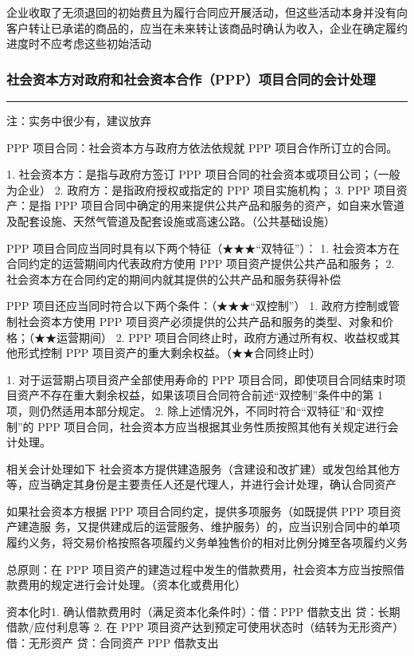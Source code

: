 \documentclass[UTF8,12pt]{ctexart}
\numberwithin{equation}{section} %
\numberwithin{figure}{section}
\numberwithin{table}{section}
\begin{document}
	企业收取了无须退回的初始费且为履行合同应开展活动，但这些活动本身并没有向客户转让已承诺的商品的，应当在未来转让该商品时确认为收入，企业在确定履约进度时不应考虑这些初始活动
	

	\subsubsection{社会资本方对政府和社会资本合作（PPP）项目合同的会计处理}
	\vspace{5pt}
	\hrule
	\vspace{5pt}
	注：实务中很少有，建议放弃
	
	PPP 项目合同：社会资本方与政府方依法依规就 PPP 项目合作所订立的合同。
	
	1.	社会资本方：是指与政府方签订 PPP 项目合同的社会资本或项目公司；（一般为企业）
	2.	政府方：是指政府授权或指定的 PPP 项目实施机构；
	3.	PPP 项目资产：是指 PPP 项目合同中确定的用来提供公共产品和服务的资产，如自来水管道及配套设施、天然气管道及配套设施或高速公路。（公共基础设施）
	
	PPP 项目合同应当同时具有以下两个特征（★★★“双特征”）：
	1.	社会资本方在合同约定的运营期间内代表政府方使用 PPP 项目资产提供公共产品和服务；
	2.	社会资本方在合同约定的期间内就其提供的公共产品和服务获得补偿
	
	PPP 项目还应当同时符合以下两个条件：（★★★“双控制”）
	1.	政府方控制或管制社会资本方使用 PPP 项目资产必须提供的公共产品和服务的类型、对象和价格；（★★运营期间）
	2.	PPP 项目合同终止时，政府方通过所有权、收益权或其他形式控制 PPP 项目资产的重大剩余权益。（★★合同终止时）
	
	1.	对于运营期占项目资产全部使用寿命的 PPP 项目合同，即使项目合同结束时项目资产不存在重大剩余权益，如果该项目合同符合前述“双控制”条件中的第 1 项，则仍然适用本部分规定。
	2.	除上述情况外，不同时符合“双特征”和“双控制”的 PPP 项目合同，社会资本方应当根据其业务性质按照其他有关规定进行会计处理。
	
	相关会计处理如下
	社会资本方提供建造服务（含建设和改扩建）或发包给其他方等，应当确定其身份是主要责任人还是代理人，并进行会计处理，确认合同资产
	
	如果社会资本方根据 PPP 项目合同约定，提供多项服务（如既提供 PPP 项目资产建造服 务，又提供建成后的运营服务、维护服务）的，应当识别合同中的单项履约义务，将交易价格按照各项履约义务单独售价的相对比例分摊至各项履约义务
	
	总原则：在 PPP 项目资产的建造过程中发生的借款费用，社会资本方应当按照借款费用的规定进行会计处理。（资本化或费用化）
	
	资本化时1.	确认借款费用时（满足资本化条件时）：借：PPP 借款支出
	贷：长期借款/应付利息等
	2.	在 PPP 项目资产达到预定可使用状态时（结转为无形资产）借：无形资产
	贷：合同资产
	PPP 借款支出
	
\end{document}
